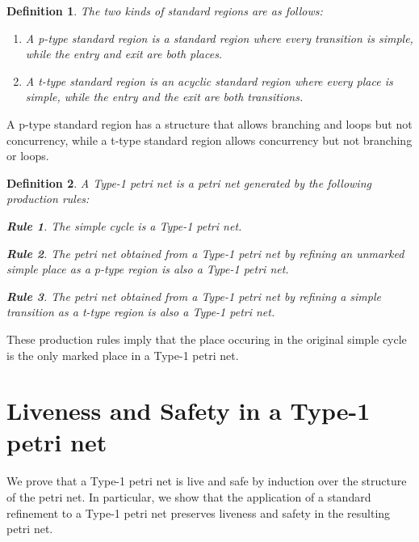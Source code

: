 \documentclass[12pt,a4paper]{article}
\newtheorem{definition}{Definition}
\newtheorem{srule}{Rule}
\begin{document}
\begin{definition} The two kinds of standard regions are as follows:
  \begin{enumerate}
  \item A \emph{p-type standard region} is a standard region where
    every transition is simple, while the entry and exit are both
    places.
  \item A \emph{t-type standard region} is an \emph{acyclic} standard
    region where every place is simple, while the entry and the exit
    are both transitions.
  \end{enumerate}
\end{definition}

A p-type standard region has a structure that allows branching and
loops but not concurrency, while a t-type standard region allows
concurrency but not branching or loops.

\begin{definition}
  A Type-1 petri net is a petri net generated by the following
  production rules:

\setcounter{srule}{-1}
\begin{srule}
  The simple cycle is a Type-1 petri net.
\end{srule}

\begin{srule}
  The petri net obtained from a Type-1 petri net by refining an
  unmarked simple place as a p-type region is also a Type-1 petri net.
\end{srule}

\begin{srule}
  The petri net obtained from a Type-1 petri net by refining a simple
  transition as a t-type region is also a Type-1 petri net.
\end{srule}

\end{definition}

These production rules imply that the place occuring in the original
simple cycle is the only marked place in a Type-1 petri net.

\section{Liveness and Safety in a Type-1 petri net}
\label{sec:live-safe}

We prove that a Type-1 petri net is live and safe by induction over
the structure of the petri net. In particular, we show that the
application of a standard refinement to a Type-1 petri net preserves
liveness and safety in the resulting petri net.
\end{document}
